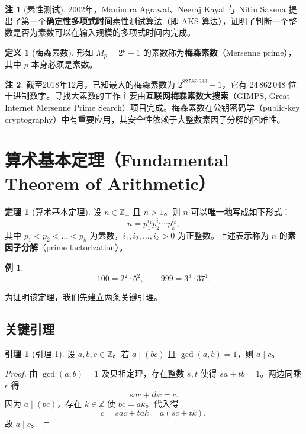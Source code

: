 \documentclass[UTF8,11pt,a4paper]{ctexbook}   %
\theoremstyle{definition}
\newtheorem{definition}{定义}[section]
\newtheorem{theorem}{定理}[section]
\newtheorem{example}{例}[section]
\newtheorem{remark}{注}[section]
\newtheorem{lemma}{引理}[section]
\begin{document}
\begin{remark}[素性测试]
2002年，Manindra Agrawal、Neeraj Kayal 与 Nitin Saxena 提出了第一个\textbf{确定性多项式时间}素性测试算法（即 AKS 算法），证明了判断一个整数是否为素数可以在输入规模的多项式时间内完成。
\end{remark}

\begin{definition}[梅森素数]
形如 $M_p=2^p-1$ 的素数称为\textbf{梅森素数}（Mersenne prime），其中 $p$ 本身必须是素数。
\end{definition}

\begin{remark}
截至2018年12月，已知最大的梅森素数为 $2^{82\,589\,933}-1$，它有 $24\,862\,048$ 位十进制数字。寻找大素数的工作主要由\textbf{互联网梅森素数大搜索}（GIMPS, Great Internet Mersenne Prime Search）项目完成。梅森素数在公钥密码学（public-key cryptography）中有重要应用，其安全性依赖于大整数素因子分解的困难性。
\end{remark}

\section{算术基本定理（Fundamental Theorem of Arithmetic）}

\begin{theorem}[算术基本定理]
设 $n\in\mathbb{Z}_+$ 且 $n>1$。则 $n$ 可以\textbf{唯一地}写成如下形式：
\[
n=p_1^{i_1}p_2^{i_2}\cdots p_k^{i_k},
\]
其中 $p_1<p_2<\dots<p_k$ 为素数，$i_1,i_2,\dots,i_k>0$ 为正整数。上述表示称为 $n$ 的\textbf{素因子分解}（prime factorization）。
\end{theorem}

\begin{example}
\[
100=2^2\cdot 5^2,\qquad 999=3^3\cdot 37^1.
\]
\end{example}

为证明该定理，我们先建立两条关键引理。

\subsection{关键引理}

\begin{lemma}[引理 1]\label{lem:bezout-cor}
设 $a,b,c\in\mathbb{Z}$。若 $a\mid(bc)$ 且 $\gcd(a,b)=1$，则 $a\mid c$。
\end{lemma}

\begin{proof}
由 $\gcd(a,b)=1$ 及贝祖定理，存在整数 $s,t$ 使得 $sa+tb=1$。两边同乘 $c$ 得
\[
sac+tbc=c.
\]
因为 $a\mid(bc)$，存在 $k\in\mathbb{Z}$ 使 $bc=ak$。代入得
\[
c=sac+tak=a(sc+tk),
\]
故 $a\mid c$。
\end{proof}
\end{document}
